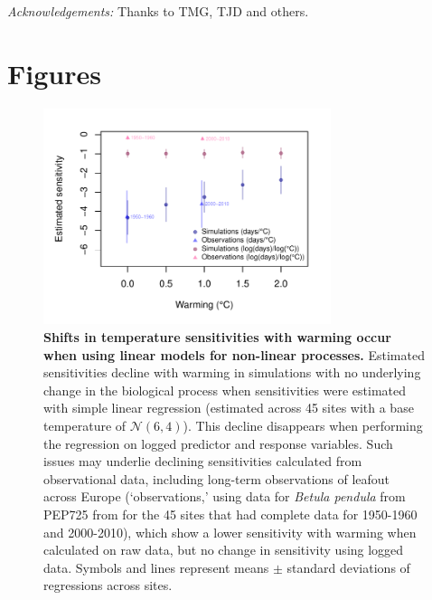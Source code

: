 \documentclass[11pt,letter]{article}
\begin{document}
\emph{Acknowledgements:} Thanks to TMG, TJD and others. 





\newpage
\section* {Figures}

\begin{figure}[h!]
\centering
\noindent \includegraphics[width=0.75\textwidth]{..//analyses/figures/basicsimsandpep.pdf}
\caption{\textbf{Shifts in temperature sensitivities with warming occur when using linear models for non-linear processes.} Estimated sensitivities decline with warming in simulations with no underlying change in the biological process when sensitivities were estimated with simple linear regression (estimated across 45 sites with a base temperature of $\mathcal{N}(6,4)$). This decline disappears when performing the regression on logged predictor and response variables. Such issues may underlie declining sensitivities calculated from observational data, including long-term observations of leafout across Europe (`observations,' using data for \emph{Betula pendula} from PEP725 from for the 45 sites that had complete data for 1950-1960 and 2000-2010), which show a lower sensitivity with warming when calculated on raw data, but no change in sensitivity using logged data. Symbols and lines represent means $\pm$ standard deviations of regressions across sites. } %
\label{fig:basicsimswpep} %
\end{figure}
\end{document}
